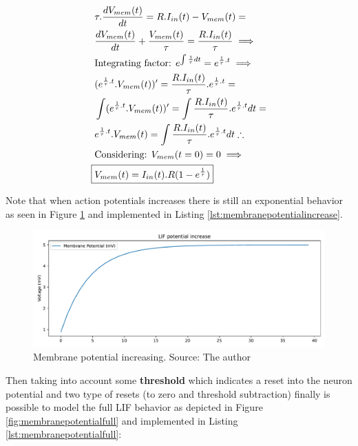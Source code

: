 		\begin{equation}
			\label{eq:actionpotincrease}
			\begin{aligned}
				&\tau.\dfrac{dV_{mem}(t)}{dt} = R.I_{in}(t) - V_{mem}(t) = \\
				&\dfrac{dV_{mem}(t)}{dt} + \frac{V_{mem}(t)}{\tau} = \frac{R.I_{in}(t)}{\tau} \implies \\
				&\text{Integrating factor: } e^{\int \frac{1}{\tau} dt} = e^{\frac{1}{\tau}.t} \implies \\
				&(e^{\frac{1}{\tau}.t}.V_{mem}(t))' = \frac{R.I_{in}(t)}{\tau}.e^{\frac{1}{\tau}.t} = \\
				&\int (e^{\frac{1}{\tau}.t}.V_{mem}(t))' = \int \frac{R.I_{in}(t)}{\tau}.e^{\frac{1}{\tau}.t} dt = \\
				&e^{\frac{1}{\tau}.t}.V_{mem}(t) = \int \frac{R.I_{in}(t)}{\tau}.e^{\frac{1}{\tau}.t} dt \therefore \\
				& \text{Considering: } V_{mem}(t=0) = 0 \implies \\
				\Aboxed{&V_{mem}(t) = I_{in}(t).R(1-e^{\frac{1}{\tau}})}
			\end{aligned}
		\end{equation}
		
		\par Note that when action potentials increases there is still an exponential behavior as seen in Figure \ref{fig:membranepotentialincrease} and implemented in Listing \ref{lst:membranepotentialincrease}.
		
		
		
		\begin{figure}[H]
			\centering
			\includegraphics[width=\linewidth]{images/membranePotentialIncrease}
			\caption{Membrane potential increasing. Source: The author}
			\label{fig:membranepotentialincrease}
		\end{figure}
		
		\par Then taking into account some \textbf{threshold} which indicates a reset into the neuron potential and two type of resets (to zero and threshold subtraction) finally is possible to model the full LIF  behavior as depicted in Figure \ref{fig:membranepotentialfull} and implemented in Listing \ref{lst:membranepotentialfull}:
		
